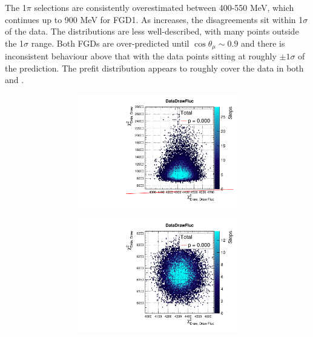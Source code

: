The 1$\pi$ selections \pmu are consistently overestimated between 400-550 MeV, which continues up to 900 MeV for FGD1. As \pmu increases, the disagreements sit within 1$\sigma$ of the data. The \cosmu distributions are less well-described, with many points outside the 1$\sigma$ range. Both FGDs are over-predicted until $\cos\theta_\mu\sim0.9$ and there is inconsistent behaviour above that with the data points sitting at roughly $\pm1\sigma$ of the prediction. The prefit distribution appears to roughly cover the data in both \pmu and \cosmu.
\begin{figure}[h]
	\begin{subfigure}[t]{\textwidth}
		\begin{subfigure}[t]{0.24\textwidth}
			\includegraphics[width=\textwidth, trim={0mm 0mm 0mm 8mm}, clip,page=10]{figures/mach3/2018/data/2018a_FixedCov_RedCov_Mpi_Data_merge_PriorPred_procs}
		\end{subfigure}
		\begin{subfigure}[t]{0.24\textwidth}
			\includegraphics[width=\textwidth, trim={0mm 0mm 0mm 8mm}, clip,page=10]{figures/mach3/2018/data/2018a_FixedCov_RedCov_Mpi_Data_merge_PostPredStore_FullLLH_procs}

\end{subfigure}
\end{subfigure}
\end{figure}

